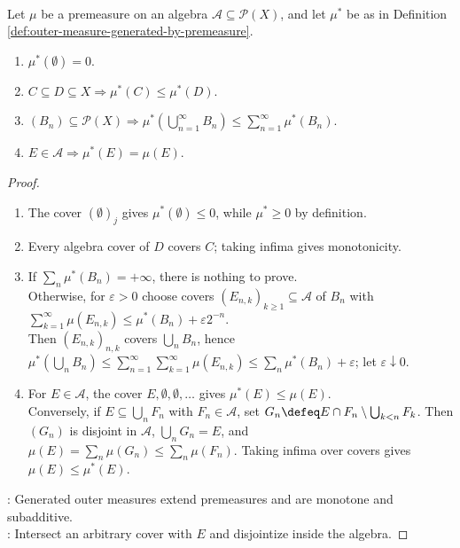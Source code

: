 \begin{lemma} \label{lem:generated-outer-measure-basic-properties} \\
Let $\mu$ be a premeasure on an algebra $\mathcal{A}\subseteq\mathcal{P}(X)$, and let $\mu^\ast$ be as in Definition \ref{def:outer-measure-generated-by-premeasure}.
\begin{enumerate}[label=(\roman*)]
\setlength{\itemsep}{0pt}
\item $\mu^\ast(\emptyset)=0$.
\item $C\subseteq D\subseteq X\Rightarrow\mu^\ast(C)\leq\mu^\ast(D)$.
\item $(B_n)\subseteq\mathcal{P}(X)\Rightarrow\mu^\ast(\bigcup_{n=1}^{\infty}B_n)\leq\sum_{n=1}^{\infty}\mu^\ast(B_n)$.
\item $E\in\mathcal{A}\Rightarrow\mu^\ast(E)=\mu(E)$.
\end{enumerate}
\begin{proof}
\begin{enumerate}[label=(\roman*)]
\setlength{\itemsep}{0pt}
\item The cover $(\emptyset)_j$ gives $\mu^\ast(\emptyset)\leq0$, while $\mu^\ast\geq0$ by definition.
\item Every algebra cover of $D$ covers $C$; taking infima gives monotonicity.
\item If $\sum_n\mu^\ast(B_n)=+\infty$, there is nothing to prove.\\
Otherwise, for $\varepsilon>0$ choose covers $(E_{n,k})_{k\geq1}\subseteq\mathcal{A}$ of $B_n$ with $\sum_{k=1}^{\infty}\mu(E_{n,k})\leq\mu^\ast(B_n)+\varepsilon2^{-n}$.\\
Then $(E_{n,k})_{n,k}$ covers $\bigcup_nB_n$, hence $\mu^\ast(\bigcup_nB_n)\leq\sum_{n=1}^{\infty}\sum_{k=1}^{\infty}\mu(E_{n,k})\leq\sum_n\mu^\ast(B_n)+\varepsilon$; let $\varepsilon\downarrow0$.
\item For $E\in\mathcal{A}$, the cover $E,\emptyset,\emptyset,\ldots$ gives $\mu^\ast(E)\leq\mu(E)$.\\
Conversely, if $E\subseteq\bigcup_nF_n$ with $F_n\in\mathcal{A}$, set $G_n\defeq E\cap F_n\setminus\bigcup_{k<n}F_k$. Then $(G_n)$ is disjoint in $\mathcal{A}$, $\bigcup_nG_n=E$, and $\mu(E)=\sum_n\mu(G_n)\leq\sum_n\mu(F_n)$. Taking infima over covers gives $\mu(E)\leq\mu^\ast(E)$.
\end{enumerate}
: Generated outer measures extend premeasures and are monotone and subadditive.\\
: Intersect an arbitrary cover with $E$ and disjointize inside the algebra.
\end{proof}
\end{lemma}

